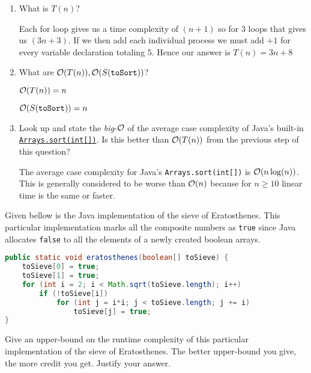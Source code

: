 \documentclass{homework}
\begin{document}
\begin{enumerate}
  \item What is $T(n)$?

        \begin{sol}
          Each for loop gives us a time complexity of $(n + 1)$ so for 3 loops
          that gives us $(3n + 3)$. If we then add each individual process we must add
          $+ 1$ for every variable declaration totaling 5. Hence our answer is $T(n) = 3n + 8$
          
        \end{sol}


  \item What are $\mathcal{O}(T(n)), \mathcal{O}(S(\texttt{toSort}))$?

        \begin{sol}
          $\mathcal{O}(T(n)) = n$ 

          $\mathcal{O}(S(\texttt{toSort})) = n$
        \end{sol}

  \item Look up and state the \textit{big}-$\mathcal{O}$ of the average case
        complexity of Java's built-in
        \href{https://tinyurl.com/jw75mfa}{\texttt{Arrays.sort(int[])}}.
        Is this better than $\mathcal{O}(T(n))$ from the previous step of this question?

        \begin{sol}
          The average case complexity for Java's \texttt{Arrays.sort(int[])} is 
          $\mathcal{O}(n\log(n))$. This is generally considered to be worse than $\mathcal{O}(n)$ because 
          for $n \geq 10$ linear time is the same or faster.
        \end{sol}
\end{enumerate}

\question Given bellow is the Java implementation of the sieve of
Eratosthenes. This particular implementation marks all the
composite numbers as \texttt{true} since Java allocates
\texttt{false} to all the elements of a newly created boolean
arrays.
\begin{lstlisting}[language=java]
public static void eratosthenes(boolean[] toSieve) {
    toSieve[0] = true;
    toSieve[1] = true;
    for (int i = 2; i < Math.sqrt(toSieve.length); i++)
        if (!toSieve[i])
            for (int j = i*i; j < toSieve.length; j += i)
                toSieve[j] = true;
}
\end{lstlisting}
Give an upper-bound on the runtime complexity of this particular
implementation of the sieve of Eratosthenes. The better
upper-bound you give, the more credit you get. Justify your
answer.
\end{document}
